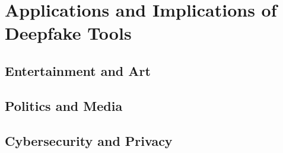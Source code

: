 
\chapter{Applications and Implications of Deepfake Tools}\label{chapter:applications}

\section{Entertainment and Art}\label{chapter:art}
\section{Politics and Media}\label{chapter:media}
\section{Cybersecurity and Privacy}\label{chapter:cybersecurity}
